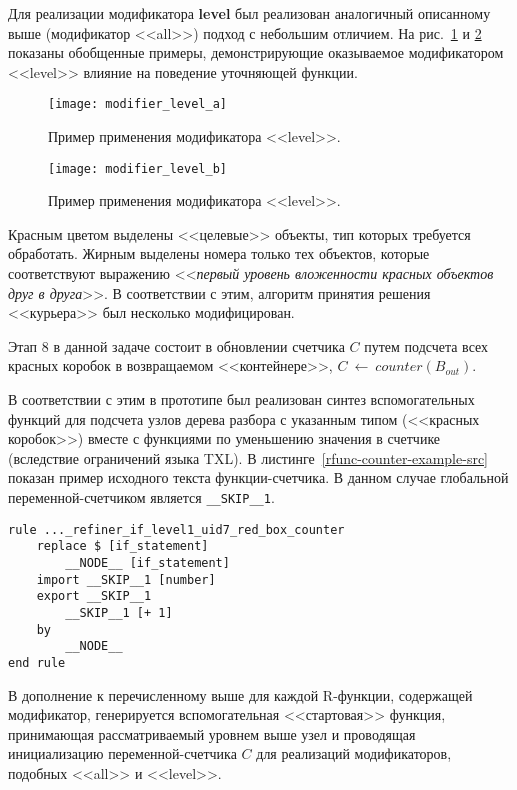 Для реализации модификатора \textbf{level} был реализован аналогичный описанному выше (модификатор <<all>>) подход с небольшим отличием.
На рис.~\ref{fig:modifier_level_a} и \ref{fig:modifier_level_b} показаны обобщенные примеры, демонстрирующие оказываемое модификатором <<level>> влияние на поведение уточняющей функции.
\begin{figure}[!h]
  \centering
  \texttt{[image: modifier\_level\_a]}
  \caption{Пример применения модификатора <<level>>.}
  \label{fig:modifier_level_a}
\end{figure}
\begin{figure}[!h]
  \centering
  \texttt{[image: modifier\_level\_b]}
  \caption{Пример применения модификатора <<level>>.}
  \label{fig:modifier_level_b}
\end{figure}
Красным цветом выделены <<целевые>> объекты, тип которых требуется обработать.
Жирным выделены номера только тех объектов, которые соответствуют выражению <<\textit{первый уровень вложенности красных объектов друг в друга}>>.
В соответствии с этим, алгоритм принятия решения <<курьера>> был несколько модифицирован.

Этап 8 в данной задаче состоит в обновлении счетчика $C$ путем подсчета всех красных коробок в возвращаемом <<контейнере>>, $C~\leftarrow~counter(B_{out})$.

В соответствии с этим в прототипе был реализован синтез вспомогательных функций для подсчета узлов дерева разбора с указанным типом (<<красных коробок>>) вместе с функциями по уменьшению значения в счетчике (вследствие ограничений языка TXL).
В листинге~\ref{rfunc-counter-example-src} показан пример исходного текста функции-счетчика.
В данном случае глобальной переменной-счетчиком является \lstinline{__SKIP__1}.

\begin{lstlisting}[frame=single, language=TXL, label={rfunc-counter-example-src}, caption={Пример синтезированной функции-счетчика.}]
rule ..._refiner_if_level1_uid7_red_box_counter
	replace $ [if_statement]
		__NODE__ [if_statement]
	import __SKIP__1 [number]
	export __SKIP__1
		__SKIP__1 [+ 1]
	by
		__NODE__
end rule
\end{lstlisting}

В дополнение к перечисленному выше для каждой R-функции, содержащей модификатор, генерируется вспомогательная <<стартовая>> функция, принимающая рассматриваемый уровнем выше узел и проводящая инициализацию переменной-счетчика $C$ для реализаций модификаторов, подобных <<all>> и <<level>>.

